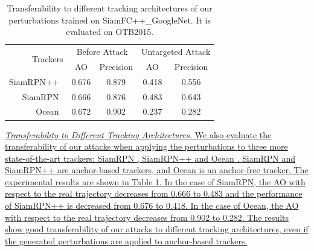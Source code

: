 \documentclass[journal]{IEEEtran}
\begin{document}
\begin{table}[t]
  \centering
  \caption{Transferability to different tracking architectures of our perturbations trained on SiamFC++\_GoogleNet. It is evaluated on OTB2015.}
  \begin{tabular}{rcccc} 
  \toprule
  \multirow{2}{*}[-2pt]{Trackers} & \multicolumn{2}{c}{Before Attack} & \multicolumn{2}{c}{Untargeted Attack}  \\
  \cmidrule{2-5}
                            & AO & Precision              & AO & Precision                   \\
  \midrule
  SiamRPN++~\cite{SiamRPN++}               & 0.676   & 0.879                  & 0.418   & 0.556                       \\
  SiamRPN~\cite{SiamRPN}                  & 0.666   & 0.876                  & 0.483   & 0.643                       \\
  Ocean~\cite{zhang2020ocean}                 & 0.672   & 0.902             & 0.237 & 0.282     \\ \bottomrule
  \end{tabular}
  \vspace{-3mm}
  \label{tab:arch}
\end{table}
\uline{\textit{Transferability to Different Tracking Architectures.} We also evaluate the transferability of our attacks when applying the perturbations to three more state-of-the-art trackers: SiamRPN \cite{SiamRPN}, SiamRPN++ \cite{SiamRPN++} and Ocean \cite{zhang2020ocean}. SiamRPN and SiamRPN++ are anchor-based trackers, and Ocean is an anchor-free tracker.
The experimental results are shown in Table \ref{tab:arch}. In the case of SiamRPN, the AO with respect to the real trajectory decreases from 0.666 to 0.483 and the performance of SiamRPN++ is decreased from 0.676 to 0.418.
In the case of Ocean, the AO with respect to the real trajectory decreases from 0.902 to 0.282.
The results show good transferability of our attacks to different tracking architectures, even if the generated perturbations are applied to anchor-based trackers.
}
\end{document}
